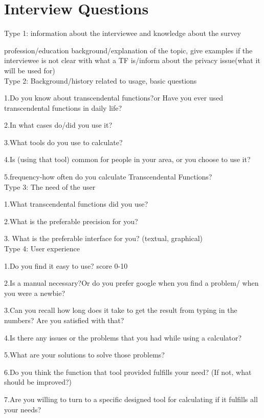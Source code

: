 \documentclass[12pt]{article}
\begin{document}
\section{Interview Questions}
Type 1: information about the interviewee and knowledge about the survey

profession/education background/explanation of the topic, give examples if the interviewee is not clear with what a TF is/inform about the privacy issue(what it will be used for)\\

Type 2: Background/history related to usage, basic questions

1.Do you know about transcendental functions?or
Have you ever used transcendental functions in daily life?

2.In what cases do/did you use it?
 
3.What tools do you use to calculate?

4.Is (using that tool) common for people in your area, or you choose to use it?

5.frequency-how often do you calculate Transcendental Functions?\\

Type 3: The need of the user

1.What transcendental functions did you use?

2.What is the preferable precision for you?

3. What is the preferable interface for you? (textual, graphical)\\
 
Type 4: User experience

1.Do you find it easy to use? score 0-10

2.Is a manual necessary?Or do you prefer google when you find a problem/ when you were a newbie?

3.Can you recall how long does it take to get the result from typing in the numbers? Are you satisfied with that?

4.Is there any issues or the problems that you had while using a calculator?

5.What are your solutions to solve those problems?

6.Do you think the function that tool provided fulfills your need? (If not, what should be improved?)
 
7.Are you willing to turn to a specific designed tool for calculating if it fulfills all your needs?\\
 
\end{document}
